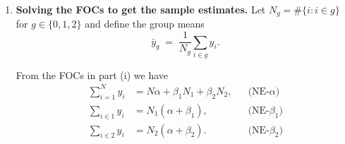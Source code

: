\documentclass[12pt]{article}
\numberwithin{equation}{section}
\begin{document}
\begin{enumerate}[label=(\alph*),leftmargin=1.3em]
\begin{enumerate}[label=\roman*.]
        Minimize the sum of squared residuals
        \[
        S(\alpha,\beta_1,\beta_2)=\sum_{i=1}^N \big(y_i-\alpha-\beta_1 D_{1i}-\beta_2 D_{2i}\big)^2.
        \]
        
        \emph{FOC w.r.t.\ $\alpha$:}
        \[
        \frac{\partial S}{\partial \alpha}
        = -2\sum_{i=1}^N\!\big(y_i-\alpha-\beta_1 D_{1i}-\beta_2 D_{2i}\big)=0
        \]
        \[
        \Longrightarrow\quad
        \sum_{i=1}^N y_i
        \;=\; N\alpha \;+\; \beta_1\sum_{i=1}^N D_{1i} \;+\; \beta_2\sum_{i=1}^N D_{2i}
        \;=\; N\alpha \;+\; \beta_1 N_1 \;+\; \beta_2 N_2. \tag{NE-$\alpha$}
        \]
        
        \emph{FOC w.r.t.\ $\beta_1$:}
        \[
        \frac{\partial S}{\partial \beta_1}
        = -2\sum_{i=1}^N\! D_{1i}\big(y_i-\alpha-\beta_1 D_{1i}-\beta_2 D_{2i}\big)=0
        \]
        \[
        \Longrightarrow\quad
        \sum_{i=1}^N D_{1i} y_i
        \;=\; \alpha\sum_{i=1}^N D_{1i} \;+\; \beta_1\sum_{i=1}^N D_{1i}^2 \;+\; \beta_2\sum_{i=1}^N D_{1i}D_{2i}.
        \]
        Using $D_{1i}^2=D_{1i}$ and $D_{1i}D_{2i}=0$,
        \[
        \sum_{i\in 1} y_i \;=\; N_1\alpha \;+\; \beta_1 N_1
        \quad\Longrightarrow\quad
        \sum_{i\in 1} y_i \;=\; N_1(\alpha+\beta_1). \tag{NE-$\beta_1$}
        \]
        
        \emph{FOC w.r.t.\ $\beta_2$:}
        \[
        \frac{\partial S}{\partial \beta_2}
        = -2\sum_{i=1}^N\! D_{2i}\big(y_i-\alpha-\beta_1 D_{1i}-\beta_2 D_{2i}\big)=0
        \]
        \[
        \Longrightarrow\quad
        \sum_{i=1}^N D_{2i} y_i
        \;=\; \alpha\sum_{i=1}^N D_{2i} \;+\; \beta_1\sum_{i=1}^N D_{1i}D_{2i} \;+\; \beta_2\sum_{i=1}^N D_{2i}^2.
        \]
        Using $D_{2i}^2=D_{2i}$ and $D_{1i}D_{2i}=0$,
        \[
        \sum_{i\in 2} y_i \;=\; N_2\alpha \;+\; \beta_2 N_2
        \quad\Longrightarrow\quad
        \sum_{i\in 2} y_i \;=\; N_2(\alpha+\beta_2). \tag{NE-$\beta_2$}
        \]
        
        The three normal equations \textnormal{(NE-$\alpha$)}, \textnormal{(NE-$\beta_1$)}, and \textnormal{(NE-$\beta_2$)} are the FOCs that define the OLS estimator for the 3–group dummy regression.
      \item 
        \textbf{Solving the FOCs to get the sample estimates.}
            Let $N_g=\#\{i:i\in g\}$ for $g\in\{0,1,2\}$ and define the group means
            \[
            \bar y_g \;=\; \frac{1}{N_g}\sum_{i\in g} y_i .
            \]
            
            From the FOCs in part (i) we have
            \begin{align}
            \sum_{i=1}^N y_i &= N\alpha + \beta_1 N_1 + \beta_2 N_2, &&\text{(NE-$\alpha$)}\label{nea}\\
            \sum_{i\in 1} y_i &= N_1(\alpha+\beta_1), &&\text{(NE-$\beta_1$)}\label{neb1}\\
            \sum_{i\in 2} y_i &= N_2(\alpha+\beta_2). &&\text{(NE-$\beta_2$)}\label{neb2}
            \end{align}
            

\end{enumerate}
\end{enumerate}
\end{document}
